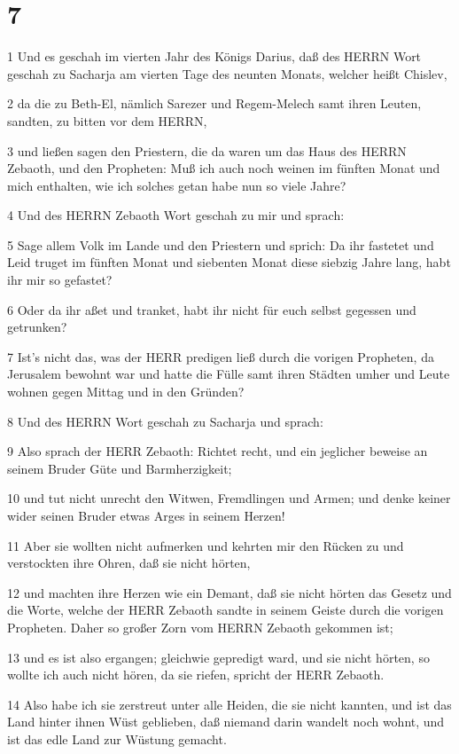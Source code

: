 \chapter{7}

\par 1 Und es geschah im vierten Jahr des Königs Darius, daß des HERRN Wort geschah zu Sacharja am vierten Tage des neunten Monats, welcher heißt Chislev,
\par 2 da die zu Beth-El, nämlich Sarezer und Regem-Melech samt ihren Leuten, sandten, zu bitten vor dem HERRN,
\par 3 und ließen sagen den Priestern, die da waren um das Haus des HERRN Zebaoth, und den Propheten: Muß ich auch noch weinen im fünften Monat und mich enthalten, wie ich solches getan habe nun so viele Jahre?
\par 4 Und des HERRN Zebaoth Wort geschah zu mir und sprach:
\par 5 Sage allem Volk im Lande und den Priestern und sprich: Da ihr fastetet und Leid truget im fünften Monat und siebenten Monat diese siebzig Jahre lang, habt ihr mir so gefastet?
\par 6 Oder da ihr aßet und tranket, habt ihr nicht für euch selbst gegessen und getrunken?
\par 7 Ist's nicht das, was der HERR predigen ließ durch die vorigen Propheten, da Jerusalem bewohnt war und hatte die Fülle samt ihren Städten umher und Leute wohnen gegen Mittag und in den Gründen?
\par 8 Und des HERRN Wort geschah zu Sacharja und sprach:
\par 9 Also sprach der HERR Zebaoth: Richtet recht, und ein jeglicher beweise an seinem Bruder Güte und Barmherzigkeit;
\par 10 und tut nicht unrecht den Witwen, Fremdlingen und Armen; und denke keiner wider seinen Bruder etwas Arges in seinem Herzen!
\par 11 Aber sie wollten nicht aufmerken und kehrten mir den Rücken zu und verstockten ihre Ohren, daß sie nicht hörten,
\par 12 und machten ihre Herzen wie ein Demant, daß sie nicht hörten das Gesetz und die Worte, welche der HERR Zebaoth sandte in seinem Geiste durch die vorigen Propheten. Daher so großer Zorn vom HERRN Zebaoth gekommen ist;
\par 13 und es ist also ergangen; gleichwie gepredigt ward, und sie nicht hörten, so wollte ich auch nicht hören, da sie riefen, spricht der HERR Zebaoth.
\par 14 Also habe ich sie zerstreut unter alle Heiden, die sie nicht kannten, und ist das Land hinter ihnen Wüst geblieben, daß niemand darin wandelt noch wohnt, und ist das edle Land zur Wüstung gemacht.

